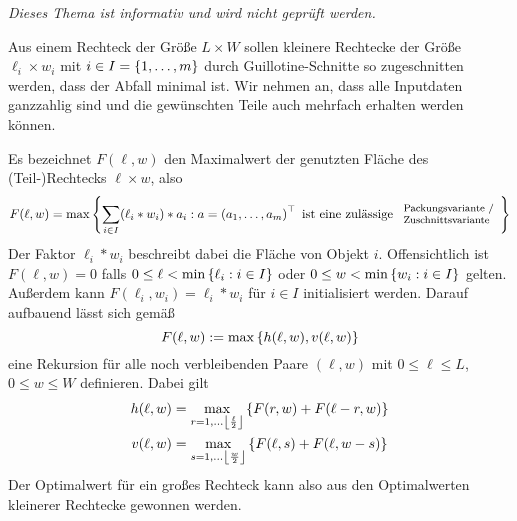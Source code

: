\begin{center}
	\color{cdgray} \osfamily \itshape Dieses Thema ist informativ und wird nicht geprüft werden.
\end{center}

Aus einem Rechteck der Größe $L \times W$ sollen kleinere Rechtecke der Größe $\ell_i \times w_i$ mit $i \in I = \left\{ 1, \dots, m \right\}$ durch Guillotine-Schnitte so zugeschnitten werden, dass der Abfall minimal ist. Wir nehmen an, dass alle Inputdaten ganzzahlig sind und die gewünschten Teile auch mehrfach erhalten werden können.

\begin{center}
	\hspace{4em}
\end{center}

Es bezeichnet $F(\ell, w)$ den Maximalwert der genutzten Fläche des (Teil-)Rechtecks $\ell \times w$, also
\begin{equation*}
	F(\ell, w) = \max\left\{ \sum_{i \in I} (\ell_i * w_i) * a_i : a = \left( a_1, \dots, a_m \right)^{\top} \text{ ist eine zulässige } 
		\footnotesize \begin{array}{l}
			\text{Packungsvariante /} \\
			\text{Zuschnittsvariante}
		\end{array}
		 \right\}
\end{equation*}
Der Faktor $\ell_i * w_i$ beschreibt dabei die Fläche von Objekt $i$.
Offensichtlich ist $F(\ell, w) = 0$ falls $0 \le \ell < \min\left\{ \ell_i : i \in I \right\}$ oder $0 \le w < \min\left\{ w_i : i \in I \right\}$ gelten. Außerdem kann $F(\ell_i, w_i) = \ell_i * w_i$ für $i \in I$ initialisiert werden. Darauf aufbauend lässt sich gemäß
\begin{equation*}
	F(\ell,w) \mathrel{:=} \max\left\{ h(\ell,w), v(\ell, w) \right\}
\end{equation*}
eine Rekursion für alle noch verbleibenden Paare $(\ell,w)$ mit $0 \le \ell \le L$, $0 \le w \le W$ definieren. Dabei gilt
\begin{equation*}
	\begin{aligned}
	h(\ell,w) &= \max_{r=1, \dots \left\lfloor \frac{\ell}{2} \right\rfloor} \left\{ F(r,w) + F(\ell-r, w) \right\} \\
	v(\ell, w) &= \max_{s=1, \dots \left\lfloor \frac{w}{2} \right\rfloor} \left\{ F(\ell,s) + F(\ell, w-s) \right\}
	\end{aligned}
\end{equation*}
Der Optimalwert für ein großes Rechteck kann also aus den Optimalwerten kleinerer Rechtecke gewonnen werden.